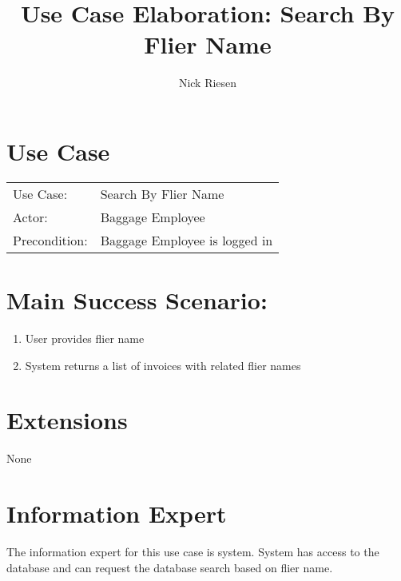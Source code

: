 \documentclass{article}
\title{Use Case Elaboration: Search By Flier Name}
\author{ Nick Riesen }
\begin{document}
\maketitle


\section*{Use Case}
\begin{tabular}{l l}
Use Case:     & Search By Flier Name          \\
Actor:        & Baggage Employee              \\
Precondition: & Baggage Employee is logged in \\
\end{tabular}


\section*{Main Success Scenario:}

\begin{enumerate}
    \item  User provides flier name
    \item System returns a list of invoices with related flier names

\end{enumerate}

\section*{Extensions}
None

\section*{Information Expert}

The information expert for this use case is system. System has access to the database and can request the database search based on flier name.
\end{document}
